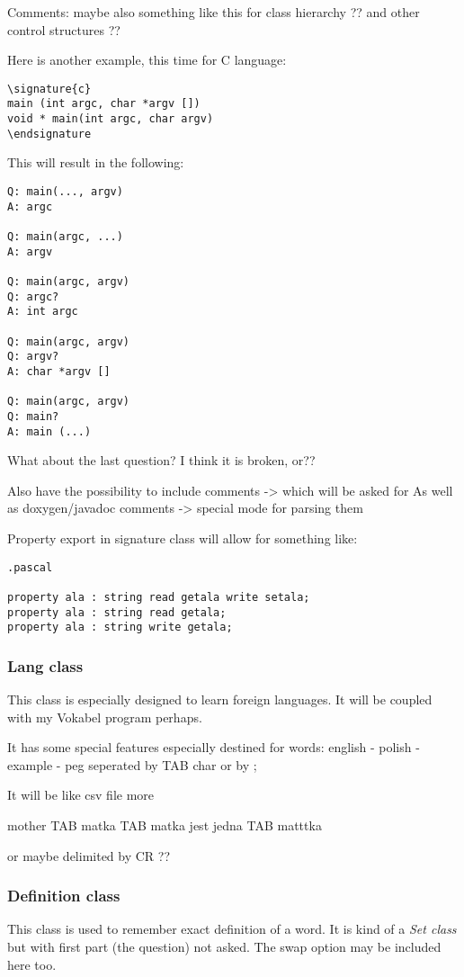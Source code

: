\documentclass[a4paper,11pt]{article}
\begin{document}
Comments:
maybe also something like this for class hierarchy ??
and other control structures ??


Here is another example, this time for C language:
\begin{verbatim}
\signature{c}
main (int argc, char *argv [])
void * main(int argc, char argv)
\endsignature
\end{verbatim}
This will result in the following:

\begin{verbatim}
Q: main(..., argv)
A: argc

Q: main(argc, ...)
A: argv

Q: main(argc, argv)
Q: argc?
A: int argc

Q: main(argc, argv)
Q: argv?
A: char *argv []

Q: main(argc, argv)
Q: main?
A: main (...)

\end{verbatim}
What about the last question? I think it is broken, or??


Also have the possibility to include comments -> which will be asked for
As well as doxygen/javadoc comments -> special mode for parsing them


Property export in signature class will allow for something like:
\begin{verbatim}
.pascal

property ala : string read getala write setala;
property ala : string read getala;
property ala : string write getala;
\end{verbatim}

\subsubsection{Lang class}
This class is especially designed to learn foreign languages. It will be
coupled with my Vokabel program perhaps.

It has some special features especially destined for words:
english - polish - example - peg
seperated by TAB char or by ;

It will be like csv file more


mother TAB matka  TAB matka jest jedna  TAB matttka

or maybe delimited by CR ??






\subsubsection{Definition class}
This class is used to remember exact definition of a word.
It is kind of a \emph{Set class} but with first part (the question) not asked.
The swap option may be included here too.
\end{document}
